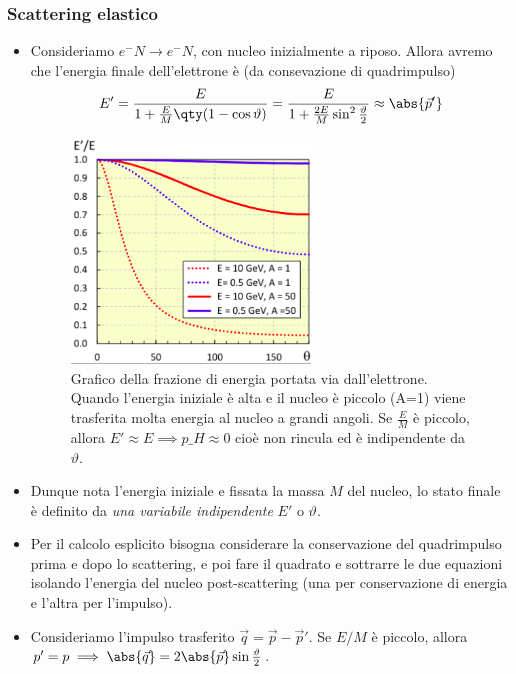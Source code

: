 \subsubsection{Scattering elastico}
\begin{itemize}
    \item Consideriamo $e^-N\to e^-N$, con nucleo inizialmente a riposo. Allora avremo che l'energia finale dell'elettrone è (da consevazione di quadrimpulso)
    \begin{equation*}
        E'=\frac E{1+\frac EM\qty(1-\cos\vartheta)}=\frac E{1+\frac{2E}{M}\sin^2\frac\vartheta2}\approx \abs{\vec p'}
    \end{equation*}
    \begin{figure}[H]
        \centering
        \includegraphics[width=0.6\textwidth]{immagini/fig_frac_energy_scatt.png}
        \caption{Grafico della frazione di energia portata via dall'elettrone. Quando l'energia iniziale è alta e il nucleo è piccolo (A=1) viene trasferita molta energia al nucleo a grandi angoli. Se $\frac EM$ è piccolo, allora $E'\approx E\implies p\_H\approx0$ cioè non rincula ed è indipendente da $\vartheta$.}
    \end{figure}
    \item Dunque nota l'energia iniziale e fissata la massa $M$ del nucleo, lo stato finale è definito da \textit{una variabile indipendente} $E'$ o $\vartheta$.
    \item Per il calcolo esplicito bisogna considerare la conservazione del quadrimpulso prima e dopo lo scattering, e poi fare il quadrato e sottrarre le due equazioni isolando l'energia del nucleo post-scattering (una per conservazione di energia e l'altra per l'impulso).
    \item Consideriamo l'impulso trasferito $\vec q = \vec p - \vec p'$. Se $E/M$ è piccolo, allora $p'=p\implies \abs{\vec q}=2\abs{\vec p}\sin\frac\vartheta2$. 

\end{itemize}
